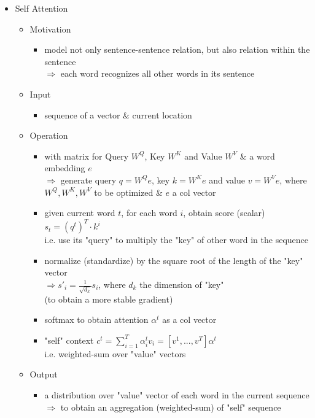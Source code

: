 \begin{itemize}
\item Self Attention
	\begin{itemize}
	\item Motivation
		\begin{itemize}
		\item model not only sentence-sentence relation, but also relation within the sentence \\
		$\Rightarrow$ each word recognizes all other words in its sentence
		\end{itemize}
	\item Input
		\begin{itemize}
		\item sequence of a vector \& current location
		\end{itemize}
	\item Operation
		\begin{itemize}
		\item with matrix for Query $W^Q$, Key $W^K$ and Value $W^V$ \& a word embedding $e$ \\
		$\Rightarrow$ generate query $q=W^Q e$, key $k=W^K e$ and value $v=W^V e$, where \\
		$W^Q, W^K, W^V$ to be optimized \& $e$ a col vector
		\item given current word $t$, for each word $i$, obtain score (scalar) $s_t=(q^t)^T\cdot {k^i}$ \\
		i.e. use its "query" to multiply the "key" of other word in the sequence
		\item normalize (standardize) by the square root of the length of the "key" vector \\
		$\Rightarrow s'_i=\frac {1} {\sqrt{d_k}} s_i$, where $d_k$ the dimension of "key" \\
		(to obtain a more stable gradient)
		\item softmax to obtain attention $\alpha^t$ as a col vector
		\item "self" context $c^t = \sum_{i=1}^{T}\alpha^t_iv_i = [v^1,...,v^{T}]\alpha^t$ \\
		i.e. weighted-sum over "value" vectors
		\end{itemize}
	\item Output
		\begin{itemize}
		\item a distribution over "value" vector of each word in the current sequence \\
		$\Rightarrow$ to obtain an aggregation (weighted-sum) of "self" sequence
		\end{itemize}

\end{itemize}
\end{itemize}
